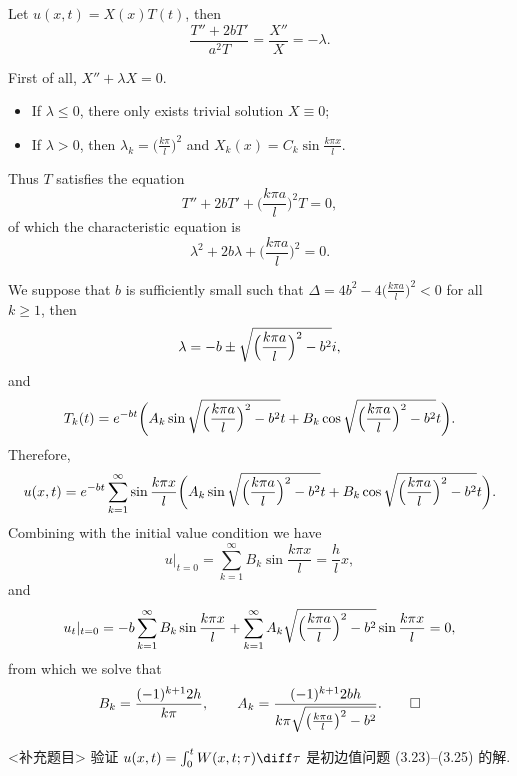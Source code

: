 \begin{solution}
  Let $u(x,t) = X(x)T(t)$, then
  \[\frac{T''+2bT'}{a^2T} = \frac{X''}{X} = -\lambda. \]

  First of all, $X'' + \lambda X = 0$.
  \begin{itemize}
    \item If $\lambda\leq 0$, there only exists trivial solution $X\equiv 0$;
    \item If $\lambda>0$, then $\lambda_k = \bigl(\frac{k\pi}{l}\bigr)^2$
      and $X_k(x) = C_k\sin\frac{k\pi x}{l}$.
  \end{itemize}

  Thus $T$ satisfies the equation
  \[ T'' + 2bT' + \biggl(\frac{k\pi a}{l}\biggr)^2 T = 0, \]
  of which the characteristic equation is
  \[ \lambda^2 + 2b\lambda + \biggl(\frac{k\pi a}{l}\biggr)^2 = 0. \]

  We suppose that $b$ is sufficiently small such that
  $\Delta = 4b^2 - 4\bigl(\frac{k\pi a}{l}\bigr)^2 < 0$ for all $k\geq 1$, then
  \[\lambda = -b \pm \sqrt{\Bigl(\frac{k\pi a}{l}\Bigr)^2 - b^2}i, \]
  and
  \[ T_k(t) = e^{-bt} \biggl(A_k \sin \sqrt{\Bigl(\frac{k\pi a}{l}\Bigr)^2 - b^2} t
    + B_k \cos \sqrt{\Bigl(\frac{k\pi a}{l}\Bigr)^2 - b^2} t\biggr). \]
  Therefore,
  \[ u(x,t) = e^{-bt} \sum_{k=1}^\infty \sin\frac{k\pi x}{l}
      \biggl(A_k \sin \sqrt{\Bigl(\frac{k\pi a}{l}\Bigr)^2 - b^2} t
      + B_k \cos \sqrt{\Bigl(\frac{k\pi a}{l}\Bigr)^2 - b^2} t\biggr). \]
  Combining with the initial value condition we have
  \[u|_{t=0} = \sum_{k=1}^\infty B_k \sin\frac{k\pi x}{l} = \frac{h}{l}x, \]
  and
  \[u_t|_{t=0} = -b\sum_{k=1}^\infty B_k \sin\frac{k\pi x}{l}
    + \sum_{k=1}^\infty A_k \sqrt{\Bigl(\frac{k\pi a}{l}\Bigr)^2-b^2}
      \sin\frac{k\pi x}{l} = 0,\]
  from which we solve that
  \[ B_k = \frac{(-1)^{k+1}2h}{k\pi},\qquad
    A_k = \frac{(-1)^{k+1}2bh}{k\pi\sqrt{\bigl(\frac{k\pi a}{l}\bigr)^2-b^2}}. \qedhere \]
\end{solution}


\begin{exercise}[7]<补充题目>
  验证 $u(x,t) = \int_0^t W(x,t;\tau)\diff\tau$ 是初边值问题 (3.23)--(3.25) 的解.
\end{exercise}

